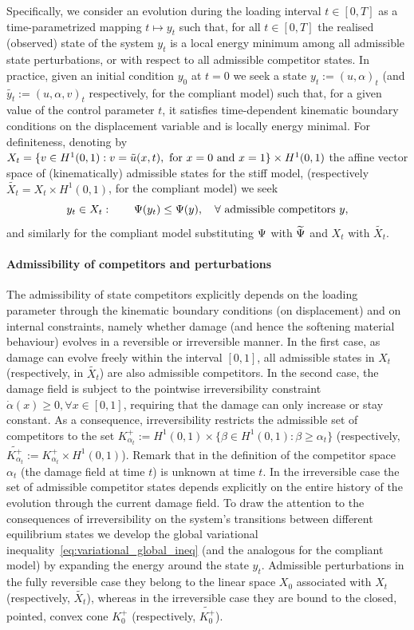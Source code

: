 \documentclass[10pt]{article}
\begin{document}
%
Specifically, we consider an evolution during the loading interval $t\in [0, T]$ as a time-parametrized mapping $t\mapsto y_t$  such that, for all $t\in [0, T]$ the realised (observed) state of the system $y_t$ is a local energy minimum among all admissible state perturbations, or with respect to all admissible competitor states. %
In practice, given an initial condition $y_0$ at $t=0$ we seek a state $y_t:=(u, \alpha)_t$ (and $\widetilde{y_t}:=(u, \alpha, v)_t$ respectively, for the compliant model) such that, for a given value of the control parameter $t$, it satisfies time-dependent kinematic boundary conditions on the displacement variable and is locally energy minimal. 
For definiteness, denoting by $X_t = \{v\in H^1(0, 1):v=\tilde u(x, t),\text{ for } x=0\text{ and } x=1\}\times H^1(0,1)$ the affine vector space of (kinematically) admissible states for the stiff model, (respectively $\widetilde{X_t} = X_t\times H^1(0, 1)$, for the compliant model) 
we seek 
%
\begin{equation}
    \label{eq:variational_global_ineq}
    y_t\in X_t: \qquad \Psi(y_t) \leq \Psi(y),\quad \forall \text{ admissible competitors } y,
\end{equation}
and similarly for the compliant model substituting $\Psi$ with $\widetilde\Psi$ and $X_t$ with $\widetilde{X_t}$.
%
%
%
%
%
\paragraph{Admissibility of competitors and perturbations}
The admissibility of state competitors explicitly depends on the loading parameter through the kinematic boundary conditions (on displacement) and on internal constraints, namely whether damage (and hence the softening material behaviour)  evolves in a reversible or irreversible manner.
In the first case, as damage can evolve freely within the interval $[0, 1]$, all admissible states in $X_t$  (respectively, in $\widetilde{X_t}$) are also admissible competitors. 
In the second case, the damage field is subject to the pointwise irreversibility constraint $\dot \alpha(x)\geq 0, \forall x\in [0, 1]$, requiring that the damage can only increase or stay constant. 
As a consequence, irreversibility restricts the admissible set of competitors to the set $K^+_{\alpha_t}:=H^1(0, 1) \times \{\beta\in H^1(0, 1): \beta\geq \alpha_t\}$ (respectively, $\widetilde{K^+_{\alpha_t}}:=K^+_{\alpha_t}\times H^1(0, 1)$). 
Remark that in the definition of the competitor space $\alpha_t$ (the damage field at time $t$) is unknown at time $t$. 
In the irreversible case the set of admissible competitor states depends explicitly on the entire history of the evolution through the current damage field.
To draw the attention to the consequences of irreversibility on the system's transitions between different equilibrium states we develop the global variational inequality~\eqref{eq:variational_global_ineq} (and the analogous for the compliant model) by expanding the energy around the state $y_t$. 
Admissible perturbations in the fully reversible case they belong to the linear space $X_0$ associated with  $X_t$ (respectively, $\widetilde{X_t}$), whereas in the irreversible case they are bound to the closed, pointed, convex cone $K^+_0$ (respectively, $\widetilde{K^+_0}$).
\end{document}
